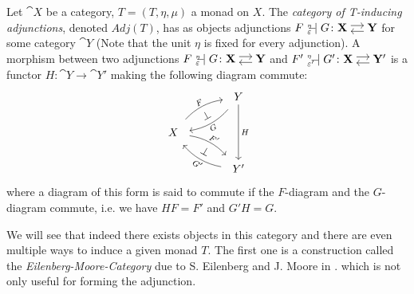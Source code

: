 \begin{definition}
    Let $\cat{X}$ be a category, $T = (T,\eta,\mu)$ a monad on $X$. The \textit{category of T-inducing adjunctions},
    denoted $Adj(T)$, has as objects adjunctions $F {\ }_{\eps}^{\text{\tiny{$\eta$}}}\!\!\!\!\adj G \colon \adjar{X}{Y}$
    for some category $\cat{Y}$ (Note that the unit $\eta$ is fixed for every adjunction).
    A morphism between two adjunctions 
    $F {\ }_{\eps}^{\text{\tiny{$\eta$}}}\!\!\!\!\adj G \colon \adjar{X}{Y}$
    and 
    $F' {\ }_{\eps'}^{\text{\tiny{$\eta$}}}\!\!\!\!\adj G' \colon \adjar{X}{Y'}$
    is a functor $H \colon \cat{Y} \to \cat{Y'}$ making the following diagram commute:
    \[
        \begin{tikzcd}[column sep = 4em]
            & Y \ar[ld,bend left=20,"G"',shorten=2mm,sloped] \ar[dd,"H"] \\
            X \ar[ru,bend left = 20,"F",shorten=2mm,sloped,pos=0.48] \ar[rd,bend left = 20,"F'",shorten=2mm,sloped,pos=0.55]
            \ar[ru,"\bot",phantom,description,sloped] \ar[rd,"\bot",phantom,description,sloped]
            & \\
            & Y' \ar[lu,bend left = 20,"G'"',shorten=2mm,sloped]
        \end{tikzcd}
    \]
    where a diagram of this form is said to commute if the $F$-diagram and the $G$-diagram commute,
    i.e. we have $HF = F'$ and $G'H = G$.
\end{definition}
We will see that indeed there exists objects in this category and there are even 
multiple ways to induce a given monad $T$. The first one is a construction called the \textit{Eilenberg-Moore-Category}
due to S. Eilenberg and J. Moore in \cite{eilenbergmoore}.
which is not only useful for forming the adjunction.



